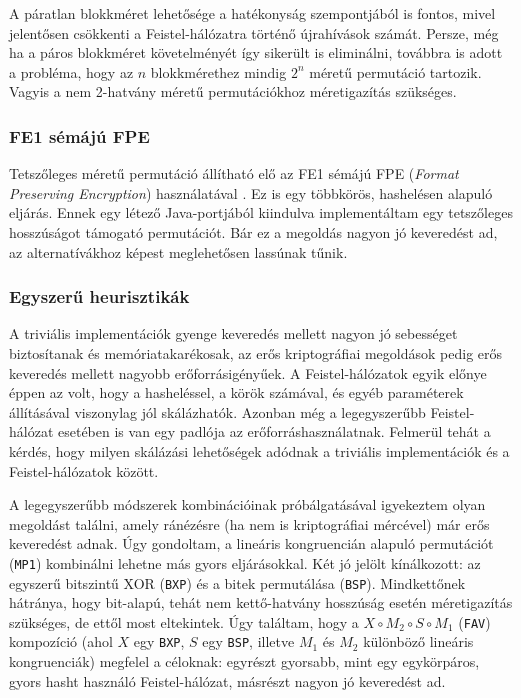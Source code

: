 \documentclass[
    parspace,
    noindent,
    nohyp,
]{elteiktdk}[2023/04/10]
\begin{document}
A páratlan blokkméret lehetősége a hatékonyság szempontjából is fontos,
mivel jelentősen csökkenti a Feistel-hálózatra történő újrahívások számát.
Persze, még ha a páros blokkméret követelményét így sikerült is eliminálni,
továbbra is adott a probléma, hogy az $n$ blokkmérethez mindig $2^n$ méretű permutáció tartozik.
Vagyis a nem 2-hatvány méretű permutációkhoz méretigazítás szükséges.

\subsubsection{FE1 sémájú FPE}

Tetszőleges méretű permutáció állítható elő az FE1 sémájú
FPE (\textit{Format Preserving Encryption}) használatával%
\cite{Bellare2009FormatPreservingE,LloydFpeFe1}.
Ez is egy többkörös, hashelésen alapuló eljárás.
Ennek egy létező Java-portjából kiindulva\cite{ShepherdFpeJava}
implementáltam egy tetszőleges hosszúságot támogató permutációt.
Bár ez a megoldás nagyon jó keveredést ad,
az alternatívákhoz képest meglehetősen lassúnak tűnik.

\subsubsection{Egyszerű heurisztikák}

A triviális implementációk gyenge keveredés mellett
nagyon jó sebességet biztosítanak és memóriatakarékosak,
az erős kriptográfiai megoldások pedig erős keveredés mellett
nagyobb erőforrásigényűek.
A Feistel-hálózatok egyik előnye éppen az volt,
hogy a hasheléssel, a körök számával, és egyéb paraméterek állításával
viszonylag jól skálázhatók.
Azonban még a legegyszerűbb Feistel-hálózat esetében is van
egy padlója az erőforráshasználatnak.
Felmerül tehát a kérdés, hogy milyen skálázási lehetőségek adódnak
a triviális implementációk és a Feistel-hálózatok között.

A legegyszerűbb módszerek kombinációinak próbálgatásával igyekeztem olyan megoldást találni,
amely ránézésre (ha nem is kriptográfiai mércével) már erős keveredést adnak.
Úgy gondoltam, a lineáris kongruencián alapuló permutációt (\texttt{MP1}) 
kombinálni lehetne más gyors eljárásokkal.
Két jó jelölt kínálkozott: az egyszerű bitszintű XOR (\texttt{BXP}) és a bitek permutálása (\texttt{BSP}).
Mindkettőnek hátránya, hogy bit-alapú, tehát nem kettő-hatvány hosszúság esetén méretigazítás szükséges,
de ettől most eltekintek.
Úgy találtam, hogy a $X \circ M_2 \circ S \circ M_1$ (\texttt{FAV}) kompozíció (ahol $X$ egy \texttt{BXP}, $S$ egy \texttt{BSP}, illetve $M_1$ és $M_2$ különböző lineáris kongruenciák)
megfelel a céloknak:
egyrészt gyorsabb, mint egy egykörpáros, gyors hasht használó Feistel-hálózat,
másrészt nagyon jó keveredést ad.
\end{document}
